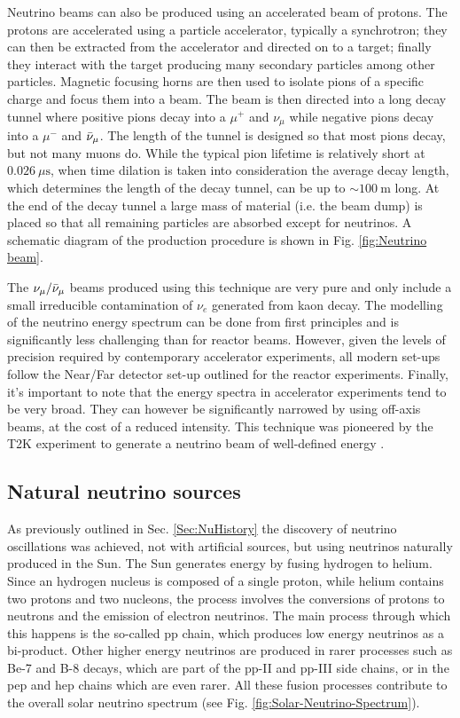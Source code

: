 Neutrino beams can also be produced using an accelerated beam of protons. The protons are accelerated using a particle accelerator, typically a synchrotron; they can then be extracted from the accelerator and directed on to a target; finally they interact with the target producing many secondary particles among other particles. Magnetic focusing horns are then used to isolate pions of a specific charge and focus them into a beam. The beam is then directed into a long decay tunnel where positive pions decay into a $\mu^+$ and $\nu_\mu$ while negative pions decay into a $\mu^-$ and $\Bar{\nu}_\mu$.  The length of the tunnel is designed so that most pions decay, but not many muons do. While the typical pion lifetime is relatively short at $0.026 \ \mu \text{s}$, when time dilation is taken into consideration the average decay length, which determines the length of the decay tunnel, can be up to $\sim 100 \ \text{m}$ long. At the end of the decay tunnel a large mass of material (i.e. the beam dump) is placed so that all remaining particles are absorbed except for neutrinos. A schematic diagram of the production procedure is shown in Fig. \ref{fig:Neutrino beam}. 

The $\nu_\mu/\Bar{\nu}_\mu$ beams produced using this technique are very pure and only include a small irreducible contamination of $\nu_e$ generated from kaon decay. The modelling of the neutrino energy spectrum can be done from first principles and is significantly less challenging than for reactor beams. However, given the levels of precision required by contemporary accelerator experiments, all modern set-ups follow the Near/Far detector set-up outlined for the reactor experiments. Finally, it's important to note that the energy spectra in accelerator experiments tend to be very broad. They can however be significantly narrowed by using off-axis beams, at the cost of a reduced intensity. This technique was pioneered by the T2K experiment to generate a neutrino beam of well-defined energy \cite{T2K:2012qoq}.
\subsection{Natural neutrino sources}
As previously outlined in Sec. \ref{Sec:NuHistory} the discovery of neutrino oscillations was achieved, not with artificial sources, but using neutrinos naturally produced in the Sun. The Sun generates energy by fusing hydrogen to helium. Since an hydrogen nucleus is composed of a single proton, while helium contains two protons and two nucleons, the process involves the conversions of protons to neutrons and the emission of electron neutrinos. The main process through which this happens is the so-called pp chain, which produces low energy neutrinos as a bi-product. Other higher energy neutrinos are produced in rarer processes such as Be-7 and B-8 decays, which are part of the pp-II and pp-III side chains, or in the pep and hep chains which are even rarer. All these fusion processes contribute to the overall solar neutrino spectrum (see Fig. \ref{fig:Solar-Neutrino-Spectrum}). 


